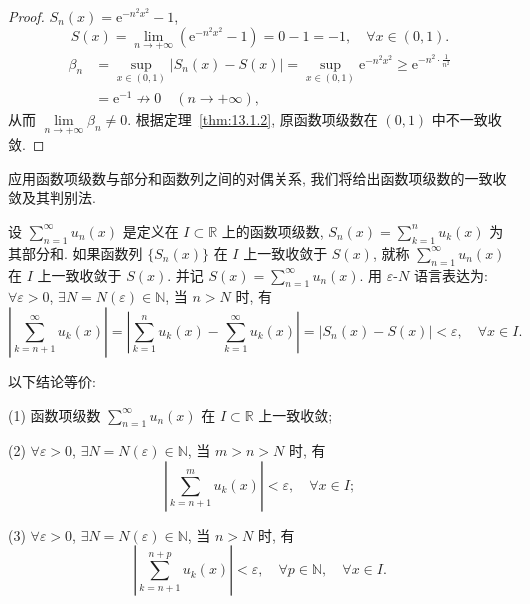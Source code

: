 \begin{proof}
$S_{n}(x)=\mathrm{e}^{-n^{2}x^{2}}-1$,
\[
  S(x)=\lim_{n\to+\infty}(\mathrm{e}^{-n^{2}x^{2}}-1)=0-1=-1,\quad\forall x\in(0,1).
\]
\[
  \begin{aligned}
    \beta_{n}&=\sup_{x\in(0,1)}|S_{n}(x)-S(x)|=\sup_{x\in(0,1)}\mathrm{e}^{-n^{2}x^{2}}\geqslant\mathrm{e}^{-n^{2}\cdot\frac{1}{n^{2}}}\\
    &=\mathrm{e}^{-1}\not\to0\quad(n\to+\infty),
  \end{aligned}
\]
从而 $\lim\limits_{n\to+\infty}\beta_{n}\neq0$. 根据定理~\ref{thm:13.1.2}, 原函数项级数在 $(0,1)$ 中不一致收敛.
\end{proof}



应用函数项级数与部分和函数列之间的对偶关系, 我们将给出函数项级数的一致收敛及其判别法.

\begin{definitionp}\label{def:13.1.2p}
设 $\sum_{n=1}^{\infty}u_{n}(x)$ 是定义在 $I\subset\mathbb{R}$ 上的函数项级数, $S_{n}(x)=\sum_{k=1}^{n}u_{k}(x)$ 为其部分和. 如果函数列 $\{S_{n}(x)\}$ 在 $I$ 上一致收敛于 $S(x)$, 就称 $\sum_{n=1}^{\infty}u_{n}(x)$ 在 $I$ 上一致收敛于 $S(x)$. 并记 $S(x)=\sum_{n=1}^{\infty}u_{n}(x)$. 用 $\varepsilon$-$N$ 语言表达为: $\forall\varepsilon>0$, $\exists N=N(\varepsilon)\in\mathbb{N}$, 当 $n>N$ 时, 有
\[
  \left|\sum_{k=n+1}^{\infty}u_{k}(x)\right|=\left|\sum_{k=1}^{n}u_{k}(x)-\sum_{k=1}^{\infty}u_{k}(x)\right|=|S_{n}(x)-S(x)|<\varepsilon,\quad\forall x\in I.
\]
\end{definitionp}

\setcounter{theorem}{1}
\begin{theoremp}\label{thm:13.1.1p}
以下结论等价:

(1) 函数项级数 $\sum_{n=1}^{\infty}u_{n}(x)$ 在 $I\subset\mathbb{R}$ 上一致收敛;

(2) $\forall\varepsilon>0$, $\exists N=N(\varepsilon)\in\mathbb{N}$, 当 $m>n>N$ 时, 有
\[
  \left|\sum_{k=n+1}^{m}u_{k}(x)\right|<\varepsilon,\quad\forall x\in I;
\]

(3) $\forall\varepsilon>0$, $\exists N=N(\varepsilon)\in\mathbb{N}$, 当 $n>N$ 时, 有
\[
  \left|\sum_{k=n+1}^{n+p}u_{k}(x)\right|<\varepsilon,\quad\forall p\in\mathbb{N},\quad\forall x\in I.
\]
\end{theoremp}
\addtocounter{theorem}{1}

